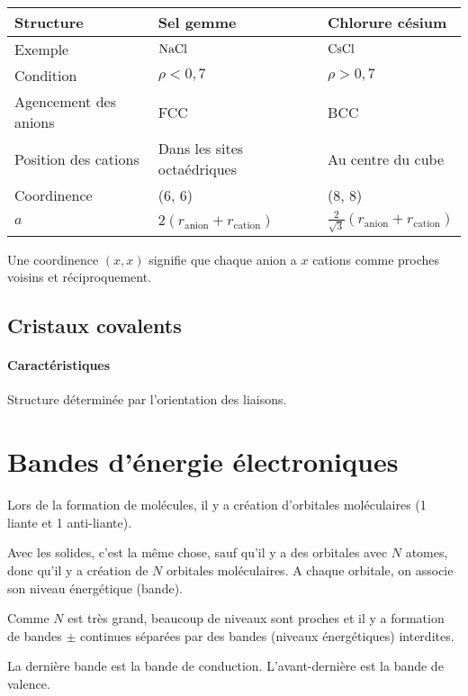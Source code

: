 \documentclass[11pt,a4paper,french]{article}
\begin{document}
\begin{center}
	\begin{tabular}{|l|l|l|}
		\hline
		Structure & Sel gemme & Chlorure césium\\
		\hline
		Exemple & $\ce{NaCl}$ & $\ce{CsCl}$\\
		\hline
		Condition & $\rho < 0,7$ & $\rho > 0,7$\\
		\hline
		Agencement des anions & FCC & BCC\\
		\hline
		Position des cations & Dans les sites octaédriques & Au centre du cube\\
		\hline
		Coordinence & (6, 6) & (8, 8)\\
		\hline
		$a$ & $2 (r_\mathrm{anion} + r_\mathrm{cation})$ & $\frac{2}{\sqrt{3}} (r_\mathrm{anion} + r_\mathrm{cation})$\\
		\hline
	\end{tabular}
\end{center}
Une coordinence $(x, x)$ signifie que chaque anion a $x$ cations comme proches voisins et réciproquement.

\subsection{Cristaux covalents}

\paragraph{Caractéristiques}
Structure déterminée par l'orientation des liaisons.

\section{Bandes d'énergie électroniques}

Lors de la formation de molécules, il y a création d'orbitales moléculaires (1 liante et 1 anti-liante).

Avec les solides, c'est la même chose, sauf qu'il y a des orbitales avec $N$ atomes, donc qu'il y a création de $N$ orbitales moléculaires.
A chaque orbitale, on associe son niveau énergétique (bande).

Comme $N$ est très grand, beaucoup de niveaux sont proches et il y a formation de bandes $\pm$ continues séparées par des bandes (niveaux énergétiques) interdites.

La dernière bande est la bande de conduction. L'avant-dernière est la bande de valence.
\end{document}
